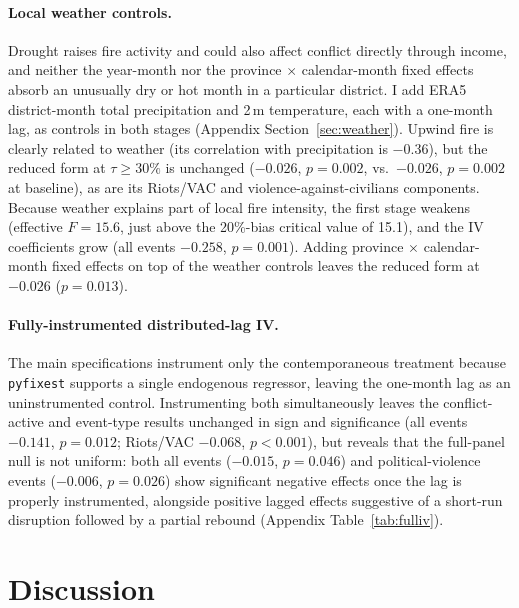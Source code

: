 \documentclass[12pt]{article}
\begin{document}
\paragraph{Local weather controls.} Drought raises fire activity and could also affect conflict directly through income, and neither the year-month nor the province $\times$ calendar-month fixed effects absorb an unusually dry or hot month in a particular district. I add ERA5 district-month total precipitation and 2\,m temperature, each with a one-month lag, as controls in both stages (Appendix Section~\ref{sec:weather}). Upwind fire is clearly related to weather (its correlation with precipitation is $-0.36$), but the reduced form at $\tau \geq 30\%$ is unchanged ($-0.026$, $p=0.002$, vs.\ $-0.026$, $p=0.002$ at baseline), as are its Riots/VAC and violence-against-civilians components. Because weather explains part of local fire intensity, the first stage weakens (effective $F = 15.6$, just above the 20\%-bias critical value of 15.1), and the IV coefficients grow (all events $-0.258$, $p=0.001$). Adding province $\times$ calendar-month fixed effects on top of the weather controls leaves the reduced form at $-0.026$ ($p=0.013$).

\paragraph{Fully-instrumented distributed-lag IV.} The main specifications instrument only the contemporaneous treatment because \texttt{pyfixest} supports a single endogenous regressor, leaving the one-month lag as an uninstrumented control. Instrumenting both simultaneously leaves the conflict-active and event-type results unchanged in sign and significance (all events $-0.141$, $p=0.012$; Riots/VAC $-0.068$, $p<0.001$), but reveals that the full-panel null is not uniform: both all events ($-0.015$, $p=0.046$) and political-violence events ($-0.006$, $p=0.026$) show significant negative effects once the lag is properly instrumented, alongside positive lagged effects suggestive of a short-run disruption followed by a partial rebound (Appendix Table~\ref{tab:fulliv}).

\section{Discussion}
\label{sec:discussion}
\end{document}
